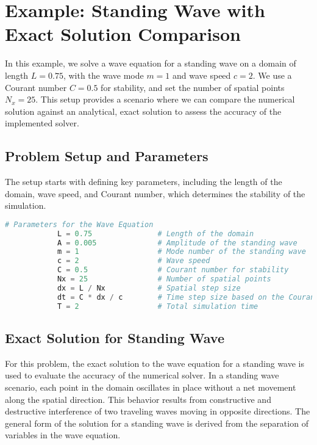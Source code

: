 \documentclass{article}
\begin{document}
	 	
	 	
	 \section{Example: Standing Wave with Exact Solution Comparison}
	 
		 In this example, we solve a wave equation for a standing wave on a domain of length \( L = 0.75 \), with the wave mode \( m = 1 \) and wave speed \( c = 2 \). We use a Courant number \( C = 0.5 \) for stability, and set the number of spatial points \( N_x = 25 \). This setup provides a scenario where we can compare the numerical solution against an analytical, exact solution to assess the accuracy of the implemented solver.
		 
		 \subsection{Problem Setup and Parameters}
		 
		 The setup starts with defining key parameters, including the length of the domain, wave speed, and Courant number, which determines the stability of the simulation.
		 
		 \begin{lstlisting}[language=Python]
		 	# Parameters for the Wave Equation
		 	L = 0.75               # Length of the domain
		 	A = 0.005              # Amplitude of the standing wave
		 	m = 1                  # Mode number of the standing wave
		 	c = 2                  # Wave speed
		 	C = 0.5                # Courant number for stability
		 	Nx = 25                # Number of spatial points
		 	dx = L / Nx            # Spatial step size
		 	dt = C * dx / c        # Time step size based on the Courant number
		 	T = 2                  # Total simulation time
		 \end{lstlisting}
		 
		 \subsection{Exact Solution for Standing Wave}
		 
		 For this problem, the exact solution to the wave equation for a standing wave is used to evaluate the accuracy of the numerical solver. In a standing wave scenario, each point in the domain oscillates in place without a net movement along the spatial direction. This behavior results from constructive and destructive interference of two traveling waves moving in opposite directions. The general form of the solution for a standing wave is derived from the separation of variables in the wave equation.
		 
\end{document}
